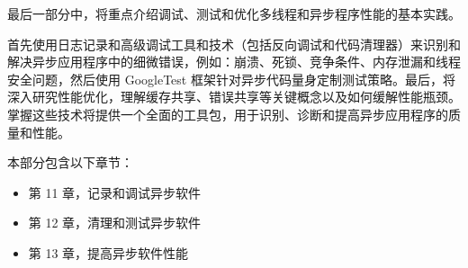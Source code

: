 最后一部分中，将重点介绍调试、测试和优化多线程和异步程序性能的基本实践。


首先使用日志记录和高级调试工具和技术（包括反向调试和代码清理器）来识别和解决异步应用程序中的细微错误，例如：崩溃、死锁、竞争条件、内存泄漏和线程安全问题，然后使用 GoogleTest 框架针对异步代码量身定制测试策略。最后，将深入研究性能优化，理解缓存共享、错误共享等关键概念以及如何缓解性能瓶颈。掌握这些技术将提供一个全面的工具包，用于识别、诊断和提高异步应用程序的质量和性能。

本部分包含以下章节：

\begin{itemize}
\item
第 11 章，记录和调试异步软件

\item
第 12 章，清理和测试异步软件

\item
第 13 章，提高异步软件性能
\end{itemize}

